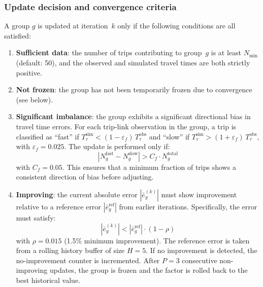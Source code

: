 \subsubsection{Update decision and convergence criteria}

A group $g$ is updated at iteration~$k$ only if the following conditions are all satisfied:

\begin{enumerate}
    \item \textbf{Sufficient data}: the number of trips contributing to group~$g$ is at least $N_{\min}$ (default: 50), and the observed and simulated travel times are both strictly positive.

    \item \textbf{Not frozen}: the group has not been temporarily frozen due to convergence (see below).

    \item \textbf{Significant imbalance}: the group exhibits a significant directional bias in travel time errors. For each trip-link observation in the group, a trip is classified as ``fast'' if $T_\tau^{\text{sim}} < (1-\varepsilon_f) \, T_\tau^{\text{obs}}$ and ``slow'' if $T_\tau^{\text{sim}} > (1+\varepsilon_f) \, T_\tau^{\text{obs}}$, with $\varepsilon_f = 0.025$. The update is performed only if:
    \begin{equation}
        |N_g^{\text{fast}} - N_g^{\text{slow}}| > C_f \cdot N_g^{\text{total}}
        \label{eq:should_update}
    \end{equation}
    with $C_f = 0.05$. This ensures that a minimum fraction of trips shows a consistent direction of bias before adjusting.

    \item \textbf{Improving}: the current absolute error $|\bar{e}_g^{(k)}|$ must show improvement relative to a reference error $|\bar{e}_g^{\text{ref}}|$ from earlier iterations. Specifically, the error must satisfy:
    \begin{equation}
        |\bar{e}_g^{(k)}| < |\bar{e}_g^{\text{ref}}| \cdot (1 - \rho)
        \label{eq:improvement}
    \end{equation}
    with $\rho = 0.015$ (1.5\% minimum improvement). The reference error is taken from a rolling history buffer of size $H = 5$. If no improvement is detected, the no-improvement counter is incremented. After $P = 3$ consecutive non-improving updates, the group is frozen and the factor is rolled back to the best historical value.
\end{enumerate}

